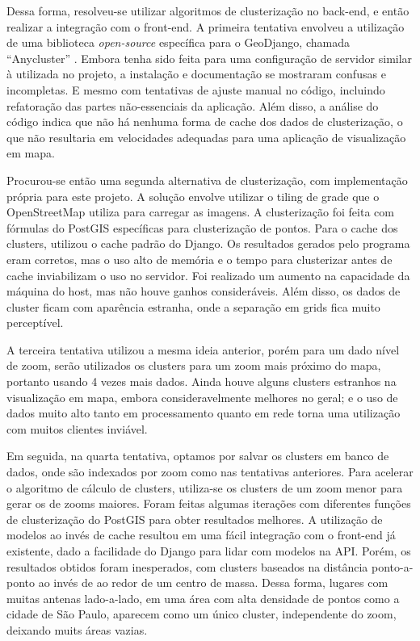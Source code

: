 \documentclass[]{politex}
\begin{document}
Dessa forma, resolveu-se utilizar algoritmos de clusterização no back-end, e
então realizar a integração com o front-end. A primeira tentativa envolveu a
utilização de uma biblioteca \textit{open-source} específica para o GeoDjango,
chamada ``Anycluster'' \cite{anycluster}. Embora tenha sido feita para uma
configuração de servidor similar à utilizada no projeto, a instalação e
documentação se mostraram confusas e incompletas. E mesmo com tentativas de
ajuste manual no código, incluindo refatoração das partes não-essenciais da
aplicação. Além disso, a análise do código indica que não há nenhuma forma de
cache dos dados de clusterização, o que não resultaria em velocidades adequadas
para uma aplicação de visualização em mapa.

Procurou-se então uma segunda alternativa de clusterização, com implementação
própria para este projeto. A solução envolve utilizar o tiling de grade que o
OpenStreetMap utiliza para carregar as imagens. A clusterização foi feita com
fórmulas do PostGIS específicas para clusterização de pontos. Para o cache dos
clusters, utilizou o cache padrão do Django. Os resultados gerados pelo programa
eram corretos, mas o uso alto de memória e o tempo para clusterizar antes de
cache inviabilizam o uso no servidor. Foi realizado um aumento na capacidade
da máquina do host, mas não houve ganhos consideráveis. Além disso, os dados
de cluster ficam com aparência estranha, onde a separação em grids fica muito
perceptível.

A terceira tentativa utilizou a mesma ideia anterior, porém para um dado nível
de zoom, serão utilizados os clusters para um zoom mais próximo do mapa,
portanto usando 4 vezes mais dados. Ainda houve alguns clusters estranhos na
visualização em mapa, embora consideravelmente melhores no geral; e o uso de
dados muito alto tanto em processamento quanto em rede torna uma utilização com
muitos clientes inviável.

Em seguida, na quarta tentativa, optamos por salvar os clusters em banco de
dados, onde são indexados por zoom como nas tentativas anteriores. Para acelerar
o algoritmo de cálculo de clusters, utiliza-se os clusters de um zoom menor para
gerar os de zooms maiores. Foram feitas algumas iterações com diferentes funções
de clusterização do PostGIS para obter resultados melhores. A utilização de
modelos ao invés de cache resultou em uma fácil integração com o front-end já
existente, dado a facilidade do Django para lidar com modelos na API. Porém,
os resultados obtidos foram inesperados, com clusters baseados na distância
ponto-a-ponto ao invés de ao redor de um centro de massa. Dessa forma, lugares
com muitas antenas lado-a-lado, em uma área com alta densidade de pontos como a
cidade de São Paulo, aparecem como um único cluster, independente do zoom,
deixando muits áreas vazias.
\end{document}
